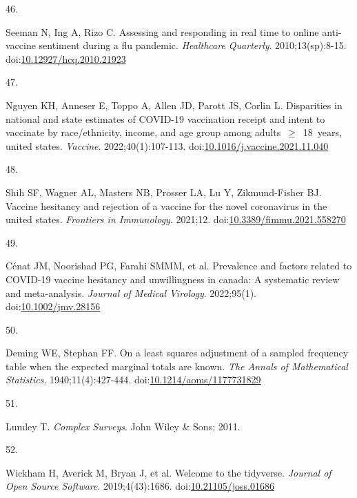 \documentclass[
]{article}
\newlength{\cslhangindent}
\newlength{\csllabelwidth}
\newlength{\cslentryspacingunit} %
\newenvironment{CSLReferences}[2] %
 {%
  \setlength{\parindent}{0pt}
  \ifodd #1
  \let\oldpar\par
  \def\par{\hangindent=\cslhangindent\oldpar}
  \fi
  \setlength{\parskip}{#2\cslentryspacingunit}
 }%
 {}
\newcommand{\CSLLeftMargin}[1]{\parbox[t]{\csllabelwidth}{#1}}
\newcommand{\CSLRightInline}[1]{\parbox[t]{\linewidth - \csllabelwidth}{#1}\break}
\begin{document}
\begin{CSLReferences}{0}{0}
\leavevmode{}%
\CSLLeftMargin{46. }%
\CSLRightInline{Seeman N, Ing A, Rizo C. Assessing and responding in
real time to online anti-vaccine sentiment during a flu pandemic.
\emph{Healthcare Quarterly}. 2010;13(sp):8-15.
doi:\href{https://doi.org/10.12927/hcq.2010.21923}{10.12927/hcq.2010.21923}}

\leavevmode{}%
\CSLLeftMargin{47. }%
\CSLRightInline{Nguyen KH, Anneser E, Toppo A, Allen JD, Parott JS,
Corlin L. Disparities in national and state estimates of {COVID}-19
vaccination receipt and intent to vaccinate by race/ethnicity, income,
and age group among adults~\(\geq\)~18~years, united states.
\emph{Vaccine}. 2022;40(1):107-113.
doi:\href{https://doi.org/10.1016/j.vaccine.2021.11.040}{10.1016/j.vaccine.2021.11.040}}

\leavevmode{}%
\CSLLeftMargin{48. }%
\CSLRightInline{Shih SF, Wagner AL, Masters NB, Prosser LA, Lu Y,
Zikmund-Fisher BJ. Vaccine hesitancy and rejection of a vaccine for the
novel coronavirus in the united states. \emph{Frontiers in Immunology}.
2021;12.
doi:\href{https://doi.org/10.3389/fimmu.2021.558270}{10.3389/fimmu.2021.558270}}

\leavevmode{}%
\CSLLeftMargin{49. }%
\CSLRightInline{Cénat JM, Noorishad PG, Farahi SMMM, et al. Prevalence
and factors related to {COVID}-19 vaccine hesitancy and unwillingness in
canada: A systematic review and meta-analysis. \emph{Journal of Medical
Virology}. 2022;95(1).
doi:\href{https://doi.org/10.1002/jmv.28156}{10.1002/jmv.28156}}

\leavevmode{}%
\CSLLeftMargin{50. }%
\CSLRightInline{Deming WE, Stephan FF. On a least squares adjustment of
a sampled frequency table when the expected marginal totals are known.
\emph{The Annals of Mathematical Statistics}. 1940;11(4):427-444.
doi:\href{https://doi.org/10.1214/aoms/1177731829}{10.1214/aoms/1177731829}}

\leavevmode{}%
\CSLLeftMargin{51. }%
\CSLRightInline{Lumley T. \emph{Complex Surveys}. John Wiley \& Sons;
2011.}

\leavevmode{}%
\CSLLeftMargin{52. }%
\CSLRightInline{Wickham H, Averick M, Bryan J, et al. Welcome to the
{tidyverse}. \emph{Journal of Open Source Software}. 2019;4(43):1686.
doi:\href{https://doi.org/10.21105/joss.01686}{10.21105/joss.01686}}


\end{CSLReferences}
\end{document}
